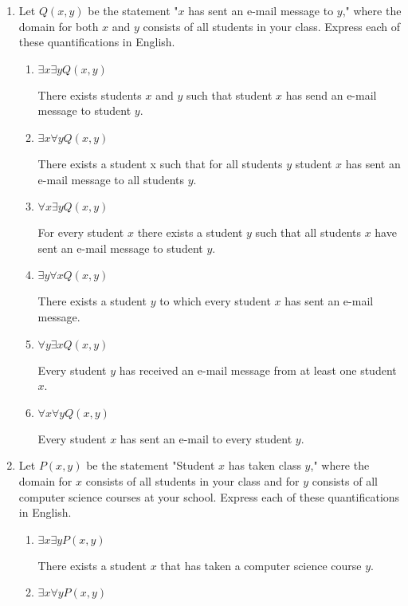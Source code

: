 \documentclass[11pt]{article}
\begin{document}
\begin{enumerate}[label=\textbf{\arabic*.}]
	\item Let $Q(x, y)$ be the statement "$x$ has sent an e-mail message to $y$," where the domain for both $x$ and $y$ consists of all students in your class. Express each of these quantifications in English.
	\begin{enumerate}[label=\textbf{\alph*)}]
		\item $\exists x\exists yQ(x, y)$
		
		There exists students $x$ and $y$ such that student $x$ has send an e-mail message to student $y$.
		
		\item $\exists x\forall yQ(x, y)$
		
		There exists a student x such that for all students $y$ student $x$ has sent an e-mail message to all students $y$.
		
		\item $\forall x\exists yQ(x, y)$
		
		For every student $x$ there exists a student $y$ such that all students $x$ have sent an e-mail message to student $y$.
		
		\item $\exists y\forall xQ(x, y)$
		
		There exists a student $y$ to which every student $x$ has sent an e-mail message.
		
		\item $\forall y\exists xQ(x, y)$
		
		Every student $y$ has received an e-mail message from at least one student $x$.
		
		\item $\forall x\forall yQ(x, y)$
		
		Every student $x$ has sent an e-mail to every student $y$.
	\end{enumerate}

	\item Let $P(x, y)$ be the statement "Student $x$ has taken class $y$," where the domain for $x$ consists of all students in your class and for $y$ consists of all computer science courses at your school. Express each of these quantifications in English.
	\begin{enumerate}[label=\textbf{\alph*)}]
		\item $\exists x\exists yP(x, y)$
		
		There exists a student $x$ that has taken a computer science course $y$.
		
		\item $\exists x\forall yP(x, y)$
		

\end{enumerate}
\end{enumerate}
\end{document}
